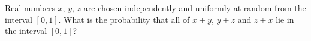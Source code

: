 Real numbers $x$, $y$, $z$ are chosen independently and uniformly at random from the interval $[0,1]$. What is the probability that all of $x+y$, $y+z$ and $z+x$ lie in the interval $[0,1]$?
